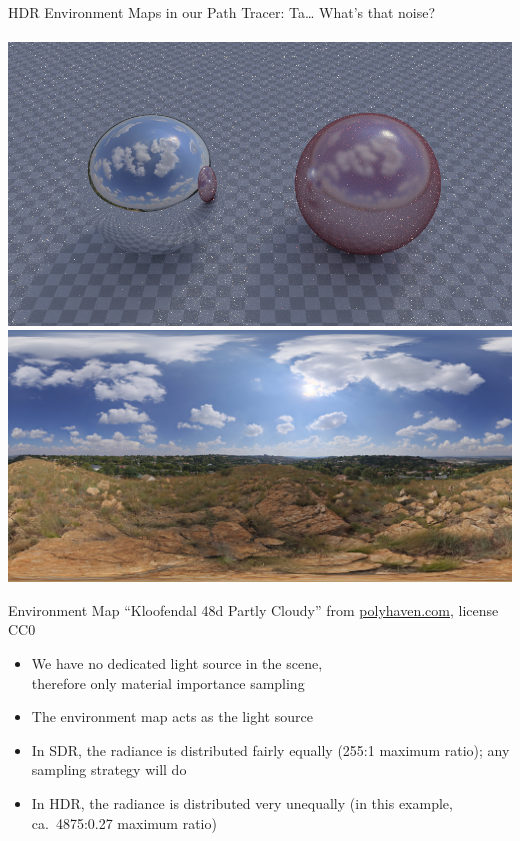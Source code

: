 \documentclass[utf8,stillsansserifmath,fleqn,t]{beamer}
\begin{document}
\begin{frame}[label=envmap-hdr]
\frametitle{\insertsection}
HDR Environment Maps in our Path Tracer: Ta\ldots{} What's that noise?\\~\\
\includegraphics[height=.34\textheight]{./fig/pathtracer-result-12-4.png}\hfill
\includegraphics[height=.34\textheight]{./fig/envmap-equirect-12-3.jpg}\\[-0.5ex]
\centerline{\tiny Environment Map ``Kloofendal 48d Partly Cloudy'' from
\href{https://polyhaven.com/a/kloofendal_48d_partly_cloudy}{polyhaven.com}, license CC0}

\begin{itemize}
\item We have no dedicated light source in the scene,\\
therefore only material importance sampling
\item The environment map acts as the light source
\item In SDR, the radiance is distributed fairly equally (255:1 maximum
ratio); any sampling strategy will do
\item In HDR, the radiance is distributed very unequally (in this example,
ca.~4875:0.27 maximum ratio)
\end{itemize}
\end{frame}
\end{document}
